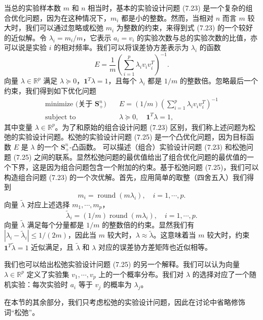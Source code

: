 \documentclass[UTF8, 12pt, fontset=fandol, oneside]{ctexart}
\begin{document}
当总的实验样本数 $m$ 和 $n$ 相当时，基本的实验设计问题 (7.23) 是一个复杂的组合优化问题，因为在这种情况下，$m_i$ 都是小的整数。然而，当相对 $n$ 而言 $m$ 较大时，我们可以通过忽略或松弛 $m_i$ 为整数的约束，来得到式 (7.23) 的一个较好的近似解。令 $\lambda_i=m_i/m$，它表示 $a_i=v_i$ 的实验次数与总的实验次数的比值，亦可以说是实验 $i$ 的相对频率。我们可以将误差协方差表示为 $\lambda_i$ 的函数
\begin{equation}
E=\frac{1}{m}\left(\sum_{i=1}^p\lambda_iv_iv_i^T\right)^{-1}.
\tag{7.24}
\end{equation}
向量 $\lambda\in\mathbb{R}^p$ 满足 $\lambda\succeq 0$，$\mathbf{1}^T\lambda=1$，且每个 $\lambda_i$ 都是 $1/m$ 的整数倍。忽略最后一个约束，我们得到如下优化问题
\begin{equation}
\begin{aligned}
\text{minimize (关于 $\mathbf{S}_+^n$)}\quad & E=(1/m)\left(\sum_{i=1}^p\lambda_iv_iv_i^T\right)^{-1}\\
\text{subject to}\quad & \lambda\succeq 0,\quad \mathbf{1}^T\lambda=1,
\end{aligned}
\tag{7.25}
\end{equation}
其中变量 $\lambda\in\mathbb{R}^p$。为了和原始的组合设计问题 (7.23) 区别，我们称上述问题为松弛的实验设计问题。松弛的实验设计问题 (7.25) 是一个凸优化问题，因为目标函数 $E$ 是 $\lambda$ 的一个 $\mathbf{S}_+^n$-凸函数。
可以描述（组合）实验设计问题 (7.23) 和松弛问题 (7.25) 之间的联系。显然松弛问题的最优值给出了组合优化问题的最优值的一个下界，这是因为组合问题包含一个附加的约束。基于松弛问题 (7.25)，我们可以构造组合问题 (7.23) 的一个次优解。首先，应用简单的取整（四舍五入）我们得到
\[
m_i=\operatorname{round}(m\lambda_i),\quad i=1,\cdots,p.
\]
向量 $\tilde{\lambda}$ 对应上述选择 $m_1,\cdots,m_p$，
\[
\tilde{\lambda}_i=(1/m)\operatorname{round}(m\lambda_i),\quad i=1,\cdots,p.
\]
向量 $\tilde{\lambda}$ 满足每个分量都是 $1/m$ 的整数倍的约束。显然我们有 $|\lambda_i-\tilde{\lambda}_i|\leq 1/(2m)$，因此当 $m$ 较大时，$\lambda\approx\tilde{\lambda}$。这意味着当 $m$ 较大时，约束 $\mathbf{1}^T\tilde{\lambda}=1$ 近似满足，且 $\tilde{\lambda}$ 和 $\lambda$ 对应的误差协方差矩阵也近似相等。

我们也可以给出松弛实验设计问题 (7.25) 的另一个解释。我们可以认为向量 $\lambda\in\mathbb{R}^p$ 定义了实验集 $v_1,\cdots,v_p$ 上的一个概率分布。我们对 $\lambda$ 的选择对应了一个随机实验：每次实验时 $a_i$ 等于 $v_j$ 的概率为 $\lambda_j$。

在本节的其余部分，我们只考虑松弛的实验设计问题，因此在讨论中省略修饰词“松弛”。
\end{document}
